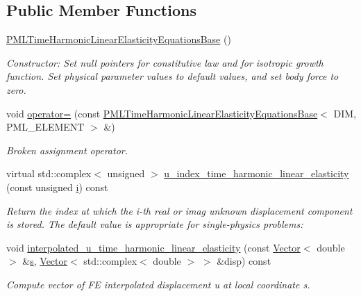 \subsection*{Public Member Functions}
\begin{DoxyCompactItemize}
\item 
\hyperlink{classoomph_1_1PMLTimeHarmonicLinearElasticityEquationsBase_afe626efd0784e879ed0b919fce975865}{P\+M\+L\+Time\+Harmonic\+Linear\+Elasticity\+Equations\+Base} ()
\begin{DoxyCompactList}\small\item\em Constructor\+: Set null pointers for constitutive law and for isotropic growth function. Set physical parameter values to default values, and set body force to zero. \end{DoxyCompactList}\item 
void \hyperlink{classoomph_1_1PMLTimeHarmonicLinearElasticityEquationsBase_a69a7137f315234c1d00fe4cc093feb14}{operator=} (const \hyperlink{classoomph_1_1PMLTimeHarmonicLinearElasticityEquationsBase}{P\+M\+L\+Time\+Harmonic\+Linear\+Elasticity\+Equations\+Base}$<$ D\+IM, P\+M\+L\+\_\+\+E\+L\+E\+M\+E\+NT $>$ \&)
\begin{DoxyCompactList}\small\item\em Broken assignment operator. \end{DoxyCompactList}\item 
virtual std\+::complex$<$ unsigned $>$ \hyperlink{classoomph_1_1PMLTimeHarmonicLinearElasticityEquationsBase_a528eb3a158c252d488c9e33d9e47df98}{u\+\_\+index\+\_\+time\+\_\+harmonic\+\_\+linear\+\_\+elasticity} (const unsigned \hyperlink{cfortran_8h_adb50e893b86b3e55e751a42eab3cba82}{i}) const
\begin{DoxyCompactList}\small\item\em Return the index at which the i-\/th real or imag unknown displacement component is stored. The default value is appropriate for single-\/physics problems\+: \end{DoxyCompactList}\item 
void \hyperlink{classoomph_1_1PMLTimeHarmonicLinearElasticityEquationsBase_a8e283b20e8f893de8fd89b91043a0d9d}{interpolated\+\_\+u\+\_\+time\+\_\+harmonic\+\_\+linear\+\_\+elasticity} (const \hyperlink{classoomph_1_1Vector}{Vector}$<$ double $>$ \&\hyperlink{cfortran_8h_ab7123126e4885ef647dd9c6e3807a21c}{s}, \hyperlink{classoomph_1_1Vector}{Vector}$<$ std\+::complex$<$ double $>$ $>$ \&disp) const
\begin{DoxyCompactList}\small\item\em Compute vector of FE interpolated displacement u at local coordinate s. \end{DoxyCompactList}\item 

\end{DoxyCompactItemize}
